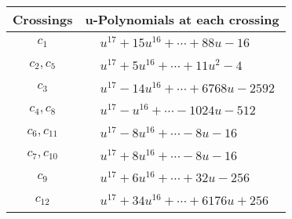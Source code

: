 \documentclass[1p]{elsarticle_modified}
\theoremstyle{definition}
\begin{document}
\begin{tabular}{m{50pt}|m{274pt}}
Crossings & \hspace{64pt}u-Polynomials at each crossing \\
\hline $$\begin{aligned}c_{1}\end{aligned}$$&$\begin{aligned}
&u^{17}+15 u^{16}+\cdots+88 u-16
\end{aligned}$\\
\hline $$\begin{aligned}c_{2},c_{5}\end{aligned}$$&$\begin{aligned}
&u^{17}+5 u^{16}+\cdots+11 u^2-4
\end{aligned}$\\
\hline $$\begin{aligned}c_{3}\end{aligned}$$&$\begin{aligned}
&u^{17}-14 u^{16}+\cdots+6768 u-2592
\end{aligned}$\\
\hline $$\begin{aligned}c_{4},c_{8}\end{aligned}$$&$\begin{aligned}
&u^{17}- u^{16}+\cdots-1024 u-512
\end{aligned}$\\
\hline $$\begin{aligned}c_{6},c_{11}\end{aligned}$$&$\begin{aligned}
&u^{17}-8 u^{16}+\cdots-8 u-16
\end{aligned}$\\
\hline $$\begin{aligned}c_{7},c_{10}\end{aligned}$$&$\begin{aligned}
&u^{17}+8 u^{16}+\cdots-8 u-16
\end{aligned}$\\
\hline $$\begin{aligned}c_{9}\end{aligned}$$&$\begin{aligned}
&u^{17}+6 u^{16}+\cdots+32 u-256
\end{aligned}$\\
\hline $$\begin{aligned}c_{12}\end{aligned}$$&$\begin{aligned}
&u^{17}+34 u^{16}+\cdots+6176 u+256
\end{aligned}$\\
\hline
\end{tabular}\\~\\
\end{document}
